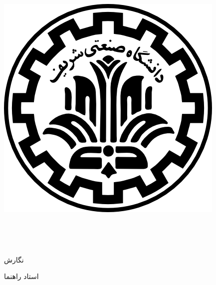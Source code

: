 
\pagestyle{empty}

\begin{center}

\includegraphics[scale=0.2]{front/template/images/logo.png}

\vspace{-0.2cm}
\ThesisUniversity \\[-0.3em]
\ThesisDepartment

\begin{large}
\vspace{0.5cm}

\ThesisType \ \ThesisDegree \\[-0.3em]
\ThesisMajor

\end{large}

\vspace{2cm}

{\LARGE\textbf{\ThesisTitle}}

\vspace{2cm}

{نگارش}\\[.5em]
{\large\textbf{\ThesisAuthor}}

\vspace{0.7cm}

{استاد راهنما}\\[.5em]
{\large\textbf{\ThesisSupervisor}}

\vspace{1.3cm}

\ThesisDate

\end{center}

\newpage
